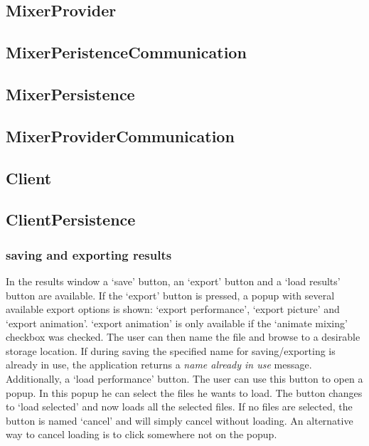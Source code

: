 \subsection{MixerProvider}

\subsection{MixerPeristenceCommunication}

\subsection{MixerPersistence}

\subsection{MixerProviderCommunication}

\subsection{Client}

\subsection{ClientPersistence}

\subsubsection{saving and exporting results}
In the results window a `save' button, an `export' button and a `load results' button are available. If the `export' button is pressed, a popup with several available export options is shown: `export performance', `export picture' and `export animation'. `export animation' is only available if the `animate mixing' checkbox was checked. The user can then name the file and browse to a desirable storage location. If during saving the specified name for saving/exporting is already in use, the application returns a \emph{name already in use} message. Additionally, a `load performance' button. The user can use this button to open a popup. In this popup he can select the files he wants to load. The button changes to `load selected' and now loads all the selected files. If no files are selected, the button is named `cancel' and will simply cancel without loading. An alternative way to cancel loading is to click somewhere not on the popup.


